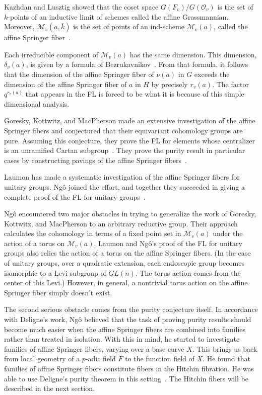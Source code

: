 \documentclass[brochure,english,12pt]{bourbaki}
\def\M{{\mathcal M}}
\def\O{{\mathcal O}}
\begin{document}
Kazhdan and Lusztig showed that the coset space $G(F_v)/G(\O_v)$ is the
set of $k$-points of an inductive limit of schemes called the affine
Grassmannian.  Moreover, $\M_v(a,\bar k)$ is the set of points of an ind-scheme $\M_v(a)$, called
the affine Springer fiber~\cite{KL:1988}.  

Each irreducible component of $\M_v(a)$ has the same dimension.  This
dimension, $\delta_v(a)$, is given by a formula of
Bezrukavnikov~\cite{Bezrukavnikov}.  From that formula, it follows
that the dimension of the affine Springer fiber of $\nu(a)$ in $G$
exceeds the dimension of the affine Springer fiber of $a$ in $H$ by
precisely $r_v(a)$.  The factor $q^{r_v(a)}$ that appears in the FL is
forced to be what it is because of this simple dimensional analysis.

Goresky, Kottwitz, and MacPherson made an extensive investigation of
the affine Springer fibers and conjectured that their equivariant
cohomology groups are pure.  Assuming this conjecture, they prove the
FL for elements whose centralizer is an unramified
Cartan subgroup~\cite{GKM:2004}.  They prove the purity result in particular cases by
constructing pavings of the affine Springer fibers~\cite{GKM:2006}.

Laumon has made a systematic investigation of
the affine Springer fibers for unitary groups.  Ng\^o joined the effort, and together they
succeeded in giving a complete proof of the FL for unitary groups~\cite{LN:08}.

Ng\^o encountered two major obstacles in trying to generalize the work of
Goresky, Kottwitz, and MacPherson to an arbitrary reductive group.
Their approach  calculates the cohomology in terms of a fixed
point set in $\M_v(a)$ under the action of a torus on $\M_v(a)$.  Laumon and
Ng\^o's proof of the FL for unitary groups also relies
the action of a torus on the affine Springer fibers.  (In the case of
unitary groups, over a quadratic extension, each
endoscopic group becomes isomorphic to a Levi subgroup of $GL(n)$.
The torus action comes from the center of this Levi.)  However, in
general, a nontrivial torus action on the affine Springer fiber simply
doesn't exist.

The second serious obstacle comes from the purity conjecture itself.
In accordance with Deligne's work, Ng\^o believed that the task of
proving purity results should become much easier when the affine
Springer fibers are combined into families rather than treated in
isolation.  With this in mind, he started to investigate families of
affine Springer fibers, varying over a base curve $X$.  This brings us
back from local geometry of a $p$-adic field $F$ to the function field of
$X$.  He found that families of affine Springer fibers 
constitute fibers in the Hitchin fibration.  He was able to use
Deligne's purity theorem in this setting~\cite{Deligne:Weil2}.  The
Hitchin fibers will be described in the next section.  
\end{document}
